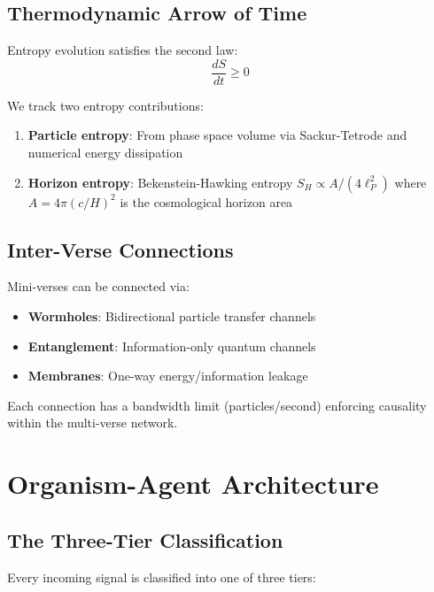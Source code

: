 \documentclass[12pt, a4paper]{article}
\begin{document}
\subsection{Thermodynamic Arrow of Time}

Entropy evolution satisfies the second law:
\begin{equation}
    \frac{dS}{dt} \geq 0
\end{equation}

We track two entropy contributions:
\begin{enumerate}
    \item \textbf{Particle entropy}: From phase space volume via Sackur-Tetrode
          and numerical energy dissipation
    \item \textbf{Horizon entropy}: Bekenstein-Hawking entropy
          $S_H \propto A / (4\ell_P^2)$ where $A = 4\pi (c/H)^2$ is the
          cosmological horizon area
\end{enumerate}

\subsection{Inter-Verse Connections}

Mini-verses can be connected via:
\begin{itemize}
    \item \textbf{Wormholes}: Bidirectional particle transfer channels
    \item \textbf{Entanglement}: Information-only quantum channels
    \item \textbf{Membranes}: One-way energy/information leakage
\end{itemize}

Each connection has a bandwidth limit (particles/second) enforcing causality
within the multi-verse network.

\section{Organism-Agent Architecture}
\label{sec:organism}

\subsection{The Three-Tier Classification}

Every incoming signal is classified into one of three tiers:
\end{document}

